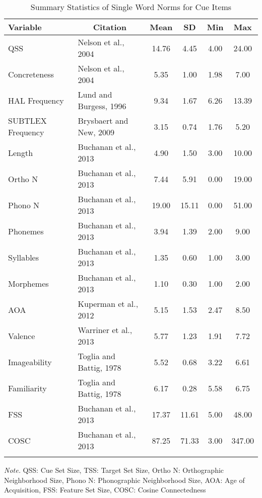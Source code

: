 \documentclass[english,man]{apa6}
\theoremstyle{definition}
\theoremstyle{definition}
\theoremstyle{definition}
\theoremstyle{remark}
\begin{document}
\begin{table}[tbp]
\begin{center}
\begin{threeparttable}
\caption{\label{tab:stim-table-cue}Summary Statistics of Single Word Norms for Cue Items}
\begin{tabular}{llcccc}
\toprule
Variable & \multicolumn{1}{c}{Citation} & \multicolumn{1}{c}{Mean} & \multicolumn{1}{c}{SD} & \multicolumn{1}{c}{Min} & \multicolumn{1}{c}{Max}\\
\midrule
QSS & Nelson et al., 2004 & 14.76 & 4.45 & 4.00 & 24.00\\
Concreteness & Nelson et al., 2004 & 5.35 & 1.00 & 1.98 & 7.00\\
HAL Frequency & Lund and Burgess, 1996 & 9.34 & 1.67 & 6.26 & 13.39\\
SUBTLEX Frequency & Brysbaert and New, 2009 & 3.15 & 0.74 & 1.76 & 5.20\\
Length & Buchanan et al., 2013 & 4.90 & 1.50 & 3.00 & 10.00\\
Ortho N & Buchanan et al., 2013 & 7.44 & 5.91 & 0.00 & 19.00\\
Phono N & Buchanan et al., 2013 & 19.00 & 15.11 & 0.00 & 51.00\\
Phonemes & Buchanan et al., 2013 & 3.94 & 1.39 & 2.00 & 9.00\\
Syllables & Buchanan et al., 2013 & 1.35 & 0.60 & 1.00 & 3.00\\
Morphemes & Buchanan et al., 2013 & 1.10 & 0.30 & 1.00 & 2.00\\
AOA & Kuperman et al., 2012 & 5.15 & 1.53 & 2.47 & 8.50\\
Valence & Warriner et al., 2013 & 5.77 & 1.23 & 1.91 & 7.72\\
Imageability & Toglia and Battig, 1978 & 5.52 & 0.68 & 3.22 & 6.61\\
Familiarity & Toglia and Battig, 1978 & 6.17 & 0.28 & 5.58 & 6.75\\
FSS & Buchanan et al., 2013 & 17.37 & 11.61 & 5.00 & 48.00\\
COSC & Buchanan et al., 2013 & 87.25 & 71.33 & 3.00 & 347.00\\
\bottomrule
\addlinespace
\end{tabular}
\begin{tablenotes}[para]
\textit{Note.} QSS: Cue Set Size, TSS: Target Set Size, Ortho N: Orthographic Neighborhood Size, Phono N: Phonographic Neighborhood Size, AOA: Age of Acquisition, FSS: Feature Set Size, COSC: Cosine Connectedness
\end{tablenotes}
\end{threeparttable}
\end{center}
\end{table}
\end{document}
